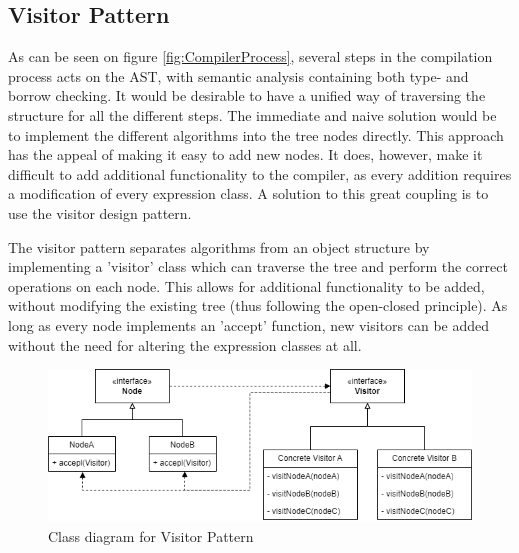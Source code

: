 \subsection{Visitor Pattern}
\label{sec:VisitorDesign}

As can be seen on figure \ref{fig:CompilerProcess}, several steps in the compilation process acts on the AST, with semantic analysis containing both type- and borrow checking.
It would be desirable to have a unified way of traversing the structure for all the different steps. The immediate and naive solution would be to implement the different algorithms into the tree nodes directly. This approach has the appeal of making it easy to add new nodes. It does, however, make it difficult to add additional functionality to the compiler, as every addition requires a modification of every expression class. A solution to this great coupling is to use the visitor design pattern.

The visitor pattern separates algorithms from an object structure by implementing a 'visitor' class which can traverse the tree and perform the correct operations on each node. This allows for additional functionality to be added, without modifying the existing tree (thus following the open-closed principle). As long as every node implements an 'accept' function, new visitors can be added without the need for altering the expression classes at all. 

\begin{figure}
\includegraphics[width=\textwidth]{02-Body/Images/VisitorClassDiag.png}
\caption{Class diagram for Visitor Pattern}
\label{fig:VisitorClassDiagram}
\end{figure}